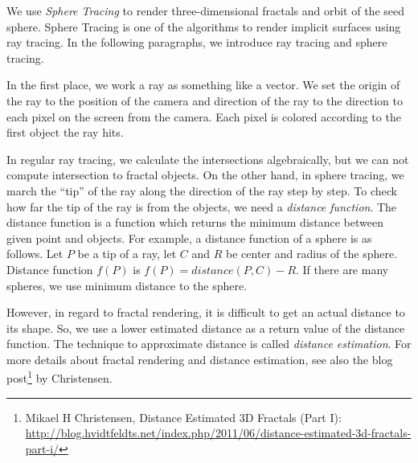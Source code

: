 We use \textit{Sphere Tracing} \cite{hart1996sphere} to render three-dimensional
fractals and orbit of the seed sphere.
Sphere Tracing is one of the algorithms to render implicit surfaces using
ray tracing.
In the following paragraphs, we introduce ray tracing and
 sphere tracing.

In the first place, we work a ray as something like a vector.
We set the origin of the ray to the position of the camera
and direction of the ray to the direction to each pixel on the screen
from the camera. Each pixel is colored according to the
first object the ray hits. 

In regular ray tracing, we calculate the intersections algebraically, but
we can not compute intersection to fractal objects.
On the other hand, in sphere tracing, we march the ``tip'' of the ray
along the direction of the ray step by step. 
To check how far the tip of the ray is from the objects, we need a
\textit{distance function}.
The distance function is a function which returns the minimum distance
between given point and objects.
For example, a distance function of a sphere is as follows.
Let $P$ be a tip of a ray, let $C$ and $R$ be center and
radius of the sphere.
Distance function $f(P)$ is $f(P) = distance(P, C) - R$.
If there are many spheres, we use minimum distance to the sphere.

However, in regard to fractal rendering, it is difficult to
get an actual distance to its shape. So, we use a lower estimated distance
as a return value of the distance function. The technique to approximate
distance is called \textit{distance estimation}.
For more details about fractal rendering and distance estimation, see also the blog
post\footnote{Mikael H Christensen, Distance Estimated 3D Fractals (Part I):\\ \quad\quad
\url{http://blog.hvidtfeldts.net/index.php/2011/06/distance-estimated-3d-fractals-part-i/}}
by Christensen. 

